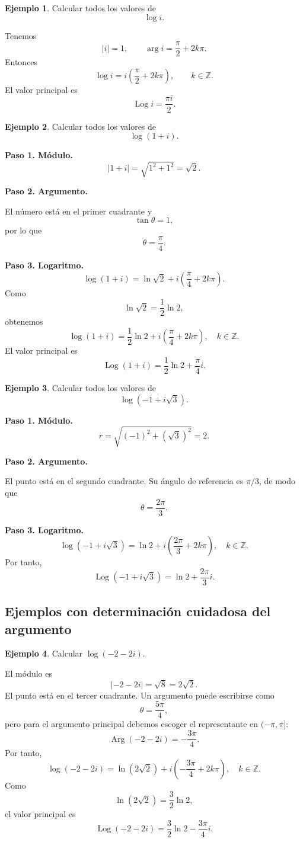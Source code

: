 \documentclass[12pt]{article}
\theoremstyle{definition}
\newtheorem{ejemplo}{Ejemplo}[section]
\theoremstyle{remark}
\begin{document}
\begin{ejemplo}
Calcular todos los valores de
\[
\log i.
\]

Tenemos
\[
|i|=1,\qquad
\arg i=\frac{\pi}{2}+2k\pi.
\]
Entonces
\[
\boxed{
\log i=i\left(\frac{\pi}{2}+2k\pi\right),
\qquad k\in\mathbb Z.
}
\]
El valor principal es
\[
\boxed{\operatorname{Log}i=\frac{\pi i}{2}.}
\]
\end{ejemplo}

\begin{ejemplo}
Calcular todos los valores de
\[
\log(1+i).
\]

\textbf{Paso 1. Módulo.}
\[
|1+i|=\sqrt{1^2+1^2}=\sqrt2.
\]

\textbf{Paso 2. Argumento.}

El número está en el primer cuadrante y
\[
\tan\theta=1,
\]
por lo que
\[
\theta=\frac{\pi}{4}.
\]

\textbf{Paso 3. Logaritmo.}
\[
\log(1+i)
=
\ln\sqrt2
+i\left(\frac{\pi}{4}+2k\pi\right).
\]
Como
\[
\ln\sqrt2=\frac12\ln2,
\]
obtenemos
\[
\boxed{
\log(1+i)
=
\frac12\ln2
+i\left(\frac{\pi}{4}+2k\pi\right),
\quad k\in\mathbb Z.
}
\]
El valor principal es
\[
\boxed{
\operatorname{Log}(1+i)
=
\frac12\ln2+\frac{\pi}{4}i.
}
\]
\end{ejemplo}

\begin{ejemplo}
Calcular todos los valores de
\[
\log(-1+i\sqrt3).
\]

\textbf{Paso 1. Módulo.}
\[
r=\sqrt{(-1)^2+(\sqrt3)^2}=2.
\]

\textbf{Paso 2. Argumento.}

El punto está en el segundo cuadrante. Su ángulo de referencia es $\pi/3$,
de modo que
\[
\theta=\frac{2\pi}{3}.
\]

\textbf{Paso 3. Logaritmo.}
\[
\boxed{
\log(-1+i\sqrt3)
=
\ln2+i\left(\frac{2\pi}{3}+2k\pi\right),
\quad k\in\mathbb Z.
}
\]
Por tanto,
\[
\boxed{
\operatorname{Log}(-1+i\sqrt3)
=
\ln2+\frac{2\pi}{3}i.
}
\]
\end{ejemplo}

\subsection{Ejemplos con determinación cuidadosa del argumento}

\begin{ejemplo}
Calcular $\log(-2-2i)$.

El módulo es
\[
|-2-2i|=\sqrt8=2\sqrt2.
\]
El punto está en el tercer cuadrante. Un argumento puede escribirse como
\[
\theta=\frac{5\pi}{4},
\]
pero para el argumento principal debemos escoger el representante en
$(-\pi,\pi]$:
\[
\operatorname{Arg}(-2-2i)=-\frac{3\pi}{4}.
\]
Por tanto,
\[
\boxed{
\log(-2-2i)
=
\ln(2\sqrt2)
+i\left(-\frac{3\pi}{4}+2k\pi\right),
\quad k\in\mathbb Z.
}
\]
Como
\[
\ln(2\sqrt2)=\frac32\ln2,
\]
el valor principal es
\[
\boxed{
\operatorname{Log}(-2-2i)
=
\frac32\ln2-\frac{3\pi}{4}i.
}
\]
\end{ejemplo}
\end{document}
